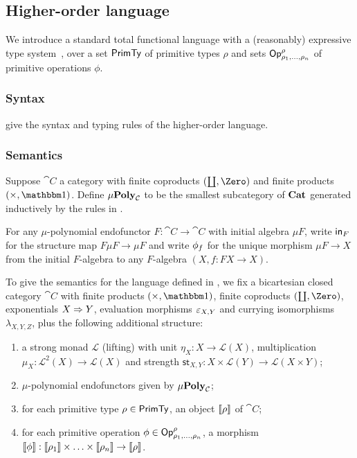 \subsection{Higher-order language}

We introduce a standard total functional language with a (reasonably) expressive type
system~\cite{crole94,pitts01,santocanale02}, over a set $\mathsf{PrimTy}$ of primitive types $\rho$ and sets
$\mathsf{Op}^\rho_{\rho_1,\ldots,\rho_n}$ of primitive operations $\phi$.

\subsubsection{Syntax}
\label{sec:language:syntax}




 give the syntax and typing rules of the higher-order language.

\subsubsection{Semantics}
\label{sec:language:semantics}




\begin{definition}[$\mu$-polynomial]
Suppose $\cat{C}$ a category with finite coproducts $(\coprod, \Zero)$ and finite products $(\times, \One)$.
Define $\mu\mathbf{Poly}_{\mathcal{C}}$ to be the smallest subcategory of $\mathbf{Cat}$ generated inductively by the rules in
.
\end{definition}

For any $\mu$-polynomial endofunctor $F: \cat{C} \to \cat{C}$ with initial algebra $\mu F$, write $\mathsf{in}_F$
for the structure map $F\mu F \to \mu F$ and write $\phi_f$ for the unique morphism $\mu F \to X$ from the
initial $F$-algebra to any $F$-algebra $(X, f: FX \to X)$.

To give the semantics for the language defined in , we fix a bicartesian closed
category $\cat{C}$ with finite products $(\times, \One)$, finite coproducts $(\coprod, \Zero)$, exponentials
$X \Rightarrow Y$, evaluation morphisms $\varepsilon_{X,Y}$ and currying isomorphisms $\lambda_{X,Y,Z}$, plus the
following additional structure:
\begin{enumerate}
\item a strong monad $\mathcal{L}$ (lifting) with unit $\eta_X: X \to \mathcal{L}(X)$, multiplication $\mu_X:
\mathcal{L}^2(X) \to \mathcal{L}(X)$ and strength $\mathsf{st}_{X,Y}: X \times \mathcal{L}(Y) \to
\mathcal{L}(X \times Y)$;
\item $\mu$-polynomial endofunctors given by $\mu\mathbf{Poly}_{\mathcal{C}}$;
\item for each primitive type $\rho \in \mathsf{PrimTy}$, an object $\llbracket \rho \rrbracket$ of $\cat{C}$;
\item for each primitive operation $\phi \in \mathsf{Op}^\rho_{\rho_1,\ldots,\rho_n}$, a morphism $\llbracket \phi \rrbracket:
\llbracket \rho_1 \rrbracket \times \ldots \times \llbracket \rho_n \rrbracket \to \llbracket \rho \rrbracket$.
\end{enumerate}

